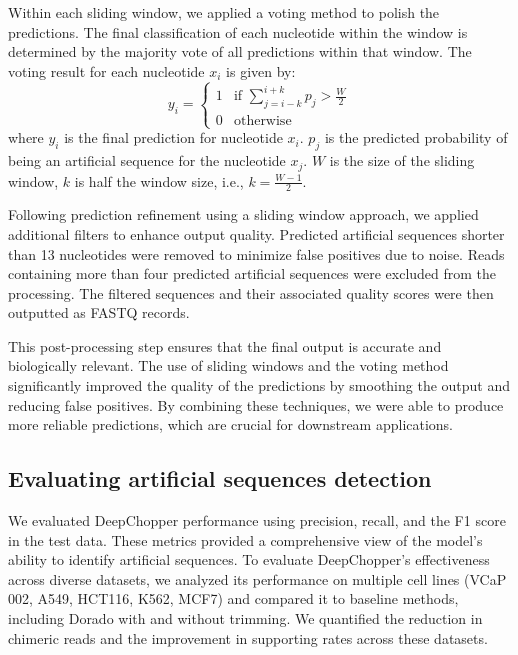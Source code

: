 \documentclass[pdflatex,sn-nature, lineno]{sn-jnl}%
\theoremstyle{thmstyleone}%
\theoremstyle{thmstyletwo}%
\theoremstyle{thmstylethree}%
\begin{document}
Within each sliding window, we applied a voting method to polish the predictions.
The final classification of each nucleotide within the window is determined by the majority vote of all predictions within that window.
The voting result for each nucleotide \( x_i \) is given by:
\[
	y_i = \begin{cases}
		1 & \text{if } \sum_{j=i-k}^{i+k} p_j > \frac{W}{2} \\
		0 & \text{otherwise}
	\end{cases}
\]
where \( y_i \) is the final prediction for nucleotide \( x_i \). \( p_j \) is the predicted probability of being an artificial sequence for the nucleotide \( x_j \). \( W \) is the size of the sliding window, \( k \) is half the window size, i.e., \( k = \frac{W-1}{2} \).

Following prediction refinement using a sliding window approach, we applied additional filters to enhance output quality.
Predicted artificial sequences shorter than 13 nucleotides were removed to minimize false positives due to noise.
Reads containing more than four predicted artificial sequences were excluded from the processing.
The filtered sequences and their associated quality scores were then outputted as FASTQ records.

This post-processing step ensures that the final output is accurate and biologically relevant.
The use of sliding windows and the voting method significantly improved the quality of the predictions by smoothing the output and reducing false positives.
By combining these techniques, we were able to produce more reliable predictions, which are crucial for downstream applications.


\subsection{Evaluating artificial sequences detection}

We evaluated DeepChopper performance using precision, recall, and the F1 score in the test data.
These metrics provided a comprehensive view of the model's ability to identify artificial sequences.
To evaluate DeepChopper's effectiveness across diverse datasets, we analyzed its performance on multiple cell lines (VCaP 002, A549, HCT116, K562, MCF7) and compared it to baseline methods, including Dorado with and without trimming.
We quantified the reduction in chimeric reads and the improvement in supporting rates across these datasets.
\end{document}
